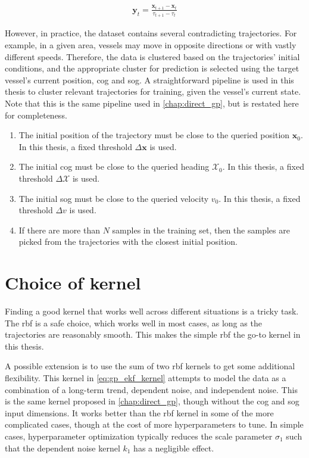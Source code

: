 \begin{align}\label{eq:finite_difference}
    \boldsymbol{y}_t = \frac{\boldsymbol{x}_{t+1} - \boldsymbol{x}_t}{\tau_{t+1} - \tau_t}
\end{align}


However, in practice, the dataset contains several contradicting trajectories. For example, in a given area, vessels may move in opposite directions or with vastly different speeds. Therefore, the data is clustered based on the trajectories' initial conditions, and the appropriate cluster for prediction is selected using the target vessel's current position, \acrshort{cog} and \acrshort{sog}. A straightforward pipeline is used in this thesis to cluster relevant trajectories for training, given the vessel's current state. Note that this is the same pipeline used in \cref{chap:direct_gp}, but is restated here for completeness.

\begin{enumerate}
    \item The initial position of the trajectory must be close to the queried position $\boldsymbol{x}_0$. In this thesis, a fixed threshold $\Delta \boldsymbol{x}$ is used.
    \item The initial \acrshort{cog} must be close to the queried heading $\mathcal{X}_0$. In this thesis, a fixed threshold $\Delta \mathcal{X}$ is used.
    \item The initial \acrshort{sog} must be close to the queried velocity $v_0$. In this thesis, a fixed threshold $\Delta v$ is used.
    \item If there are more than $N$ samples in the training set, then the samples are picked from the trajectories with the closest initial position.
\end{enumerate}

\section{Choice of kernel}
Finding a good kernel that works well across different situations is a tricky task. The \acrshort{rbf} is a safe choice, which works well in most cases, as long as the trajectories are reasonably smooth. This makes the simple \acrshort{rbf} the go-to kernel in this thesis.

A possible extension is to use the sum of two \acrshort{rbf} kernels to get some additional flexibility. This kernel in \cref{eq:gp_ekf_kernel} attempts to model the data as a combination of a long-term trend, dependent noise, and independent noise. This is the same kernel proposed in \cref{chap:direct_gp}, though without the \acrshort{cog} and \acrshort{sog} input dimensions. It works better than the \acrshort{rbf} kernel in some of the more complicated cases, though at the cost of more hyperparameters to tune. In simple cases, hyperparameter optimization typically reduces the scale parameter $\sigma_1$ such that the dependent noise kernel $k_1$ has a negligible effect.


